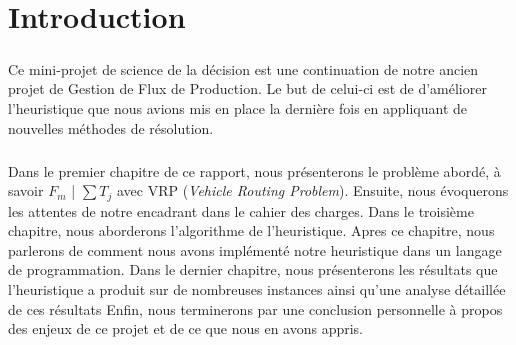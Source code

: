 \chapter{Introduction}

\paragraph{}
Ce mini-projet de science de la décision est une continuation de notre ancien projet de Gestion de Flux de Production. Le but de celui-ci est de d'améliorer l'heuristique que nous avions mis en place la dernière fois en appliquant de nouvelles méthodes de résolution.

\paragraph{}
Dans le premier chapitre de ce rapport, nous présenterons le problème abordé, à savoir $ F_m $ | $ \sum{T_{j}} $ avec VRP (\textit{Vehicle Routing Problem}).
Ensuite, nous évoquerons les attentes de notre encadrant dans le cahier des charges.
Dans le troisième chapitre, nous aborderons l'algorithme de l'heuristique.
Apres ce chapitre, nous parlerons de comment nous avons implémenté notre heuristique dans un langage de programmation.
Dans le dernier chapitre, nous présenterons les résultats que l'heuristique a produit sur de nombreuses instances ainsi qu'une analyse détaillée de ces résultats
Enfin, nous terminerons par une conclusion personnelle à propos des enjeux de ce projet et de ce que nous en avons appris.

